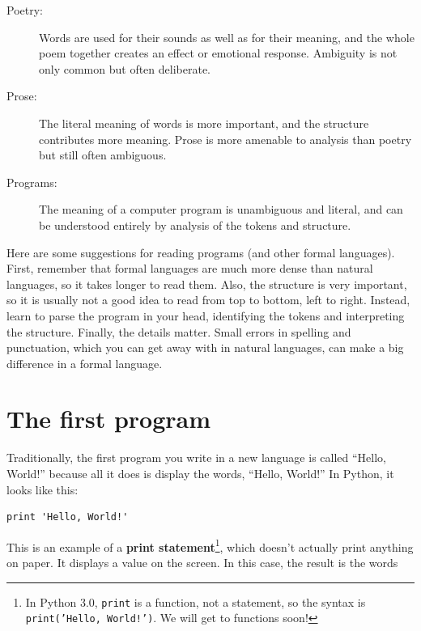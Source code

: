 \documentclass[10pt]{book}
\begin{document}

\begin{description}

\item[Poetry:] Words are used for their sounds as well as for
their meaning, and the whole poem together creates an effect or
emotional response.  Ambiguity is not only common but often
deliberate.

\item[Prose:] The literal meaning of words is more important,
and the structure contributes more meaning.  Prose is more amenable to
analysis than poetry but still often ambiguous.

\item[Programs:] The meaning of a computer program is unambiguous
and literal, and can be understood entirely by analysis of the
tokens and structure.

\end{description}

Here are some suggestions for reading programs (and other formal
languages).  First, remember that formal languages are much more dense
than natural languages, so it takes longer to read them.  Also, the
structure is very important, so it is usually not a good idea to read
from top to bottom, left to right.  Instead, learn to parse the
program in your head, identifying the tokens and interpreting the
structure.  Finally, the details matter.  Small errors in
spelling and punctuation, which you can get away
with in natural languages, can make a big difference in a formal
language.

\section{The first program}
\label{hello}


Traditionally, the first program you write in a new language
is called ``Hello, World!'' because all it does is display the
words, ``Hello, World!''  In Python, it looks like this:

\beforeverb
\begin{verbatim}
print 'Hello, World!'
\end{verbatim}
\afterverb
%
This is an example of a {\bf print statement}\footnote{In Python 3.0,
  {\tt print} is a function, not a statement, so the syntax is {\tt
    print('Hello, World!')}.  We will get to functions soon!}, which
doesn't actually print anything on paper.  It displays a value on the
screen.  In this case, the result is the words
\end{document}
